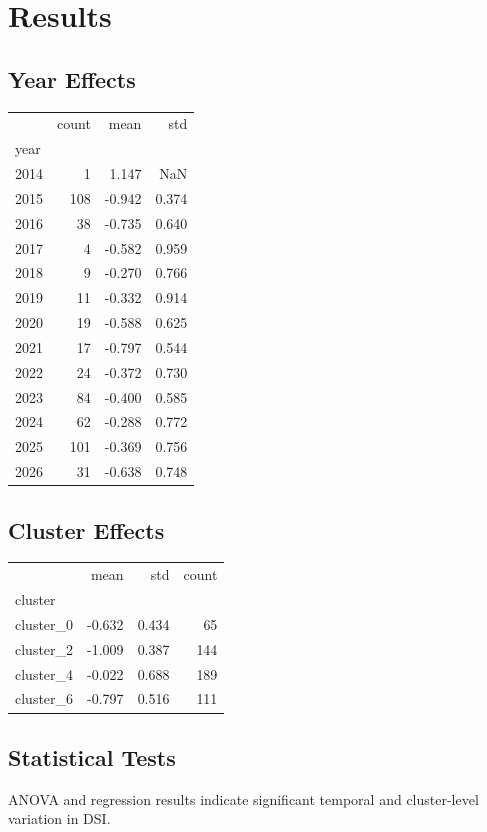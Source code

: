 \section{Results}

\subsection{Year Effects}
\begin{tabular}{lrrr}
\toprule
 & count & mean & std \\
year &  &  &  \\
\midrule
2014 & 1 & 1.147 & NaN \\
2015 & 108 & -0.942 & 0.374 \\
2016 & 38 & -0.735 & 0.640 \\
2017 & 4 & -0.582 & 0.959 \\
2018 & 9 & -0.270 & 0.766 \\
2019 & 11 & -0.332 & 0.914 \\
2020 & 19 & -0.588 & 0.625 \\
2021 & 17 & -0.797 & 0.544 \\
2022 & 24 & -0.372 & 0.730 \\
2023 & 84 & -0.400 & 0.585 \\
2024 & 62 & -0.288 & 0.772 \\
2025 & 101 & -0.369 & 0.756 \\
2026 & 31 & -0.638 & 0.748 \\
\bottomrule
\end{tabular}


\subsection{Cluster Effects}
\begin{tabular}{lrrr}
\toprule
 & mean & std & count \\
cluster &  &  &  \\
\midrule
cluster_0 & -0.632 & 0.434 & 65 \\
cluster_2 & -1.009 & 0.387 & 144 \\
cluster_4 & -0.022 & 0.688 & 189 \\
cluster_6 & -0.797 & 0.516 & 111 \\
\bottomrule
\end{tabular}


\subsection{Statistical Tests}
ANOVA and regression results indicate significant temporal and cluster-level variation in DSI.\n